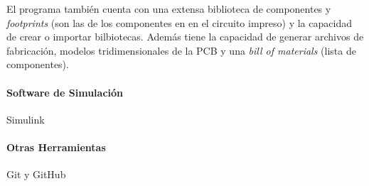 El programa también cuenta con una extensa biblioteca de componentes y \textit{footprints} (son las  de los componentes en en el circuito impreso) y la capacidad de crear o importar bilbiotecas. Además tiene la capacidad de generar archivos de fabricación, modelos tridimensionales de la PCB y una \textit{bill of materials} (lista de componentes).\\

\paragraph{Software de Simulación} Simulink

\paragraph{Otras Herramientas} Git y GitHub